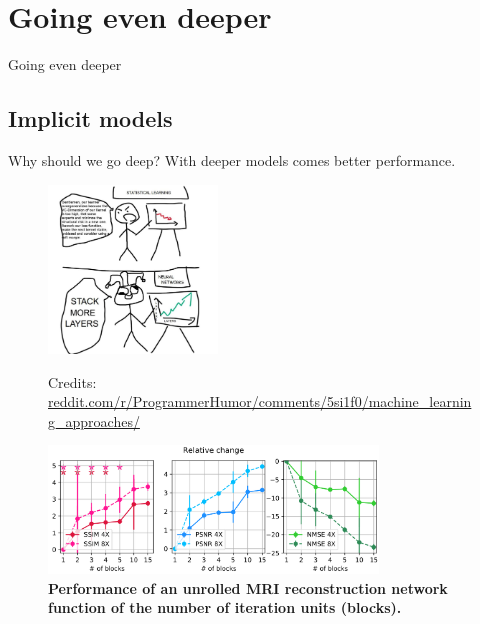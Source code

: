 \section{Going even deeper}

\begin{frame}[plain,c]
    
    \begin{center}
        \color{DarkBlue}
    \Huge Going even deeper
    \end{center}
    
\end{frame}

\subsection{Implicit models}

\begin{frame}{Why should we go deep?}
    With deeper models comes better performance.
    \begin{figure}
        \begin{overprint}
            \centering\includegraphics[width=0.4\textwidth]{Figures/shine_figures/more_layers.jpg}\caption{Credits: \href{reddit.com/r/ProgrammerHumor/comments/5si1f0/machine_learning_approaches/}{reddit.com/r/ProgrammerHumor/comments/5si1f0/machine\_learning\_approaches/}}
            \centering\includegraphics[width=0.78\textwidth]{Figures/shine_figures/pezzotti.png}\caption{\textbf{Performance of an unrolled MRI reconstruction network function of the number of iteration units (blocks).}}
        \end{overprint}
    \end{figure}
\end{frame}

